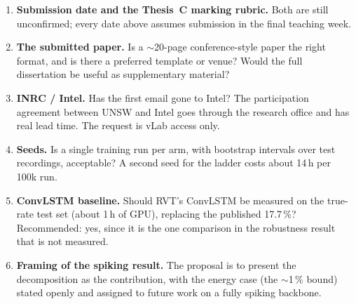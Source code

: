 \documentclass[10pt,a4paper]{article}
\begin{document}
\begin{enumerate}[leftmargin=1.5em]
  \item \textbf{Submission date and the Thesis~C marking rubric.} Both are still unconfirmed; every date above
  assumes submission in the final teaching week.
  \item \textbf{The submitted paper.} Is a $\sim$20-page conference-style paper the right format, and is there
  a preferred template or venue? Would the full dissertation be useful as supplementary material?
  \item \textbf{INRC / Intel.} Has the first email gone to Intel? The participation agreement between UNSW
  and Intel goes through the research office and has real lead time. The request is vLab access only.
  \item \textbf{Seeds.} Is a single training run per arm, with bootstrap intervals over test recordings,
  acceptable? A second seed for the ladder costs about 14\,h per 100k run.
  \item \textbf{ConvLSTM baseline.} Should RVT's ConvLSTM be measured on the true-rate test set (about 1\,h
  of GPU), replacing the published 17.7\,\%? Recommended: yes, since it is the one comparison in the
  robustness result that is not measured.
  \item \textbf{Framing of the spiking result.} The proposal is to present the decomposition as the
  contribution, with the energy case (the $\sim$1\,\% bound) stated openly and assigned to future work on a
  fully spiking backbone.
\end{enumerate}

\small


\end{document}
